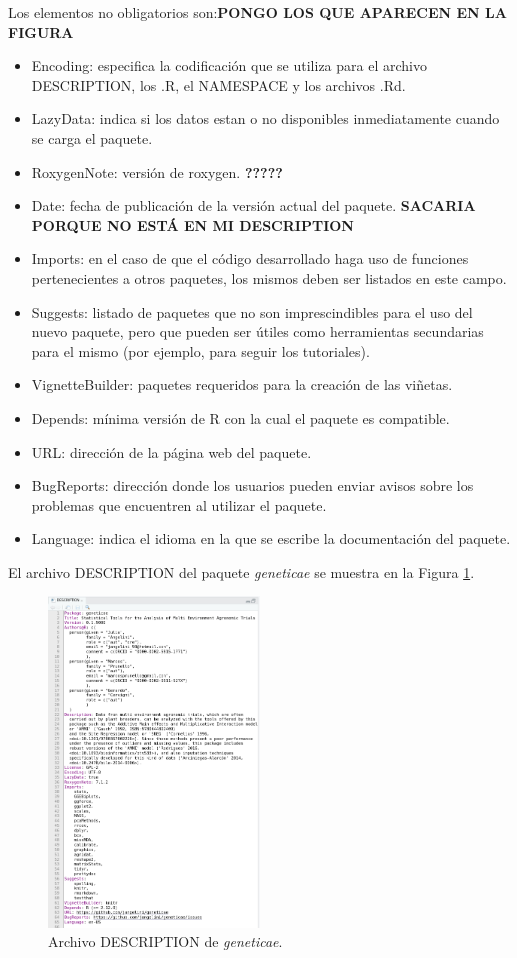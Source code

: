 Los elementos no obligatorios son:\textbf{PONGO LOS QUE APARECEN EN LA FIGURA}

\begin{itemize}
\item Encoding: especifica la codificación que se utiliza para el archivo DESCRIPTION, los .R, el NAMESPACE y los archivos .Rd.
\item LazyData: indica si los datos estan o no disponibles inmediatamente cuando se carga el paquete.
\item RoxygenNote: versión de roxygen. \textbf{?????}
\item Date: fecha de publicación de la versión actual del paquete. \textbf{SACARIA PORQUE NO ESTÁ EN MI DESCRIPTION}
\item Imports: en el caso de que el código desarrollado haga uso de funciones pertenecientes a otros paquetes, los mismos deben ser listados en este campo.
\item Suggests: listado de paquetes que no son imprescindibles para el uso del nuevo paquete, pero que pueden ser útiles como herramientas secundarias para el mismo (por ejemplo, para seguir los tutoriales).
\item VignetteBuilder: paquetes requeridos para la creación de las viñetas.
\item Depends: mínima versión de R con la cual el paquete es compatible.
\item URL: dirección de la página web del paquete.
\item BugReports: dirección donde los usuarios pueden enviar avisos sobre los problemas que encuentren al utilizar el paquete.
\item Language: indica el idioma en la que se escribe la documentación del paquete.
\end{itemize}

El archivo DESCRIPTION del paquete \emph{geneticae} se muestra en la Figura \ref{fig:fig33}.
\begin{figure}[h]
	\begin{center}
		\includegraphics[width=0.50\textwidth]{./Graficos/DESCRIPTION.png}	
	\end{center}
	\caption{Archivo DESCRIPTION de \emph{geneticae}.}
	\label{fig:fig33}
\end{figure}


